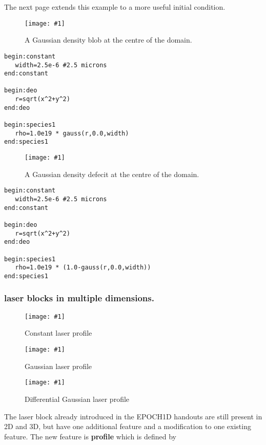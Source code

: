 \documentclass[12pt]{article}
\newcommand{\inlineemph}{\color{warwicklight} \bf}
\newcommand{\boxverbatim}[1]{\begin{Verbatim}[obeytabs=true,frame=single,
  framerule=0.5mm,rulecolor=\color{warwickmid},label=#1]}
\newcommand{\scaledcapimage}[4]
  {{\begin{figure}\centering \texttt{[image: \#1]} \caption{#3}
    \label{#2} \end{figure}}}
\begin{document}
The next page extends this example to a more useful initial condition.

\scaledcapimage{./images/gaussic.eps}{gaussblob}{A Gaussian density blob at the
centre of the domain.}{0.4}

\begin{minipage}{\textwidth}
\boxverbatim{species block to set up Gaussian density blob}
begin:constant
   width=2.5e-6 #2.5 microns
end:constant

begin:deo
   r=sqrt(x^2+y^2)
end:deo

begin:species1
   rho=1.0e19 * gauss(r,0.0,width)
end:species1
\end{Verbatim}
\end{minipage}

\scaledcapimage{./images/invgaussic.eps}{inversegaussblob}{A Gaussian density
defecit at the centre of the domain.}{0.4}

\begin{minipage}{\textwidth}
\boxverbatim{species block to set up Gaussian density blob}
begin:constant
   width=2.5e-6 #2.5 microns
end:constant

begin:deo
   r=sqrt(x^2+y^2)
end:deo

begin:species1
   rho=1.0e19 * (1.0-gauss(r,0.0,width))
end:species1
\end{Verbatim}
\end{minipage}

\pagebreak

\subsubsection{{\inlineemph laser} blocks in multiple dimensions.}

\scaledcapimage{./images/profile_flat.eps}{flatlaser}{Constant laser
profile}{0.4} \scaledcapimage{./images/profile_gauss.eps}{gausslaser}{Gaussian
laser profile}{0.4}
\scaledcapimage{./images/profile_diff_gauss.eps}{diffgausslaser}{Differential
Gaussian laser profile}{0.4}

The laser block already introduced in the EPOCH1D handouts are still present in
2D and 3D, but have one additional feature and a modification to one existing
feature. The new feature is {\inlineemph profile} which is defined
by\\
\end{document}
